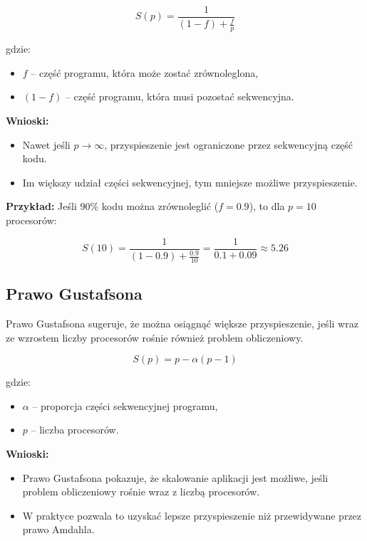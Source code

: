 \begin{equation}
    S(p) = \frac{1}{(1 - f) + \frac{f}{p}}
\end{equation}

gdzie:
\begin{itemize}
    \item \( f \) – część programu, która może zostać zrównoleglona,
    \item \( (1 - f) \) – część programu, która musi pozostać sekwencyjna.
\end{itemize}

\textbf{Wnioski:}
\begin{itemize}
    \item Nawet jeśli \( p \to \infty \), przyspieszenie jest ograniczone przez sekwencyjną część kodu.
    \item Im większy udział części sekwencyjnej, tym mniejsze możliwe przyspieszenie.
\end{itemize}

\textbf{Przykład:}
Jeśli 90\% kodu można zrównoleglić (\( f = 0.9 \)), to dla \( p = 10 \) procesorów:

\begin{equation}
    S(10) = \frac{1}{(1 - 0.9) + \frac{0.9}{10}} = \frac{1}{0.1 + 0.09} \approx 5.26
\end{equation}

\subsection{Prawo Gustafsona}
Prawo Gustafsona sugeruje, że można osiągnąć większe przyspieszenie, jeśli wraz ze wzrostem liczby procesorów rośnie również problem obliczeniowy.

\begin{equation}
    S(p) = p - \alpha (p - 1)
\end{equation}

gdzie:
\begin{itemize}
    \item \( \alpha \) – proporcja części sekwencyjnej programu,
    \item \( p \) – liczba procesorów.
\end{itemize}

\textbf{Wnioski:}
\begin{itemize}
    \item Prawo Gustafsona pokazuje, że skalowanie aplikacji jest możliwe, jeśli problem obliczeniowy rośnie wraz z liczbą procesorów.
    \item W praktyce pozwala to uzyskać lepsze przyspieszenie niż przewidywane przez prawo Amdahla.
\end{itemize}

